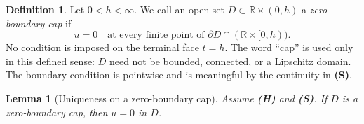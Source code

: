 \documentclass[11pt,reqno]{amsart}
\numberwithin{equation}{section}
\newtheorem{lemma}[theorem]{Lemma}
\theoremstyle{definition}
\newtheorem{definition}[theorem]{Definition}
\theoremstyle{remark}
\newcommand{\R}{\mathbb R}
\begin{document}
\begin{definition}\label{def:cap}
Let $0<h<\infty$. We call an open set $D\subset\R\times(0,h)$ a \emph{zero-boundary cap} if
\begin{equation}\label{eq:cap}
 u=0\quad\text{at every finite point of }
 \partial D\cap(\R\times[0,h)).
\end{equation}
No condition is imposed on the terminal face $t=h$.  The word
``cap'' is used only in this defined sense: $D$ need not be bounded,
connected, or a Lipschitz domain.  The boundary condition is pointwise
and is meaningful by the continuity in \textbf{(S)}.
\end{definition}

\begin{lemma}[Uniqueness on a zero-boundary cap]\label{lem:cap}
Assume \textbf{(H)} and \textbf{(S)}. If $D$ is a zero-boundary cap, then $u=0$ in $D$.
\end{lemma}
\end{document}
